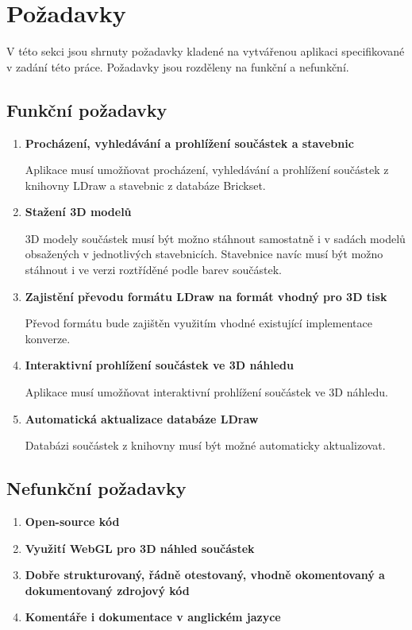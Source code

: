 \section{Požadavky}
V této sekci jsou shrnuty požadavky kladené na vytvářenou aplikaci specifikované v zadání této práce. Požadavky jsou rozděleny na funkční a nefunkční.

\subsection{Funkční požadavky}

\begin{enumerate}[label=FP-\arabic*:]
    \item \label{fp:model:search} \textbf{Procházení, vyhledávání a prohlížení součástek a stavebnic}

    Aplikace musí umožňovat procházení, vyhledávání a prohlížení součástek z knihovny LDraw a stavebnic z databáze Brickset. 

    \item \label{fp:model:download} \textbf{Stažení 3D modelů}

    3D modely součástek musí být možno stáhnout samostatně i v sadách modelů obsažených v jednotlivých stavebnicích. Stavebnice navíc musí být možno stáhnout i ve verzi roztříděné podle barev součástek.

    \item \label{fp:model:prevod} \textbf{Zajistění převodu formátu LDraw na formát vhodný pro 3D tisk}

    Převod formátu bude zajištěn využitím vhodné existující implementace konverze. 

    \item \label{fp:model:3Dview} \textbf{Interaktivní prohlížení součástek ve 3D náhledu}

    Aplikace musí umožňovat interaktivní prohlížení součástek ve 3D náhledu.

    \item \label{fp:model:update} \textbf{Automatická aktualizace databáze LDraw}

    Databázi součástek z knihovny musí být možné automaticky aktualizovat.

\end{enumerate}

\subsection{Nefunkční požadavky}

\begin{enumerate}[label=NP-\arabic*:,resume]
    \item \label{np:opensource} \textbf{Open-source kód}
    \item \label{np:webgl} \textbf{Využití WebGL pro 3D náhled součástek}
    \item \label{np:structure} \textbf{Dobře strukturovaný, řádně otestovaný, vhodně okomentovaný a dokumentovaný zdrojový kód}
    \item \label{np:english} \textbf{Komentáře i dokumentace v anglickém jazyce}
\end{enumerate}